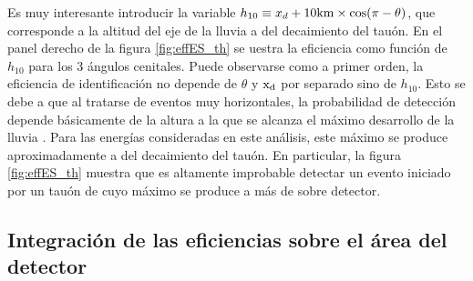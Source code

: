 	Es muy interesante introducir la variable $h_{10}\equiv x_d + 10{\rm km} \times\cos(\pi-\theta)$, que corresponde a la altitud del eje de la lluvia a  del decaimiento del tauón.
	En el panel derecho de la figura \ref{fig:effES_th} se uestra la eficiencia como función de $h_{10}$ para los 3 ángulos cenitales.
	Puede observarse como a primer orden, la eficiencia de identificación no depende de $\theta$ y ${\rm x_d}$ por separado sino de $h_{10}$.
	Esto se debe a que al tratarse de eventos muy horizontales, la probabilidad de detección depende básicamente de la altura a la que se alcanza el máximo desarrollo de la lluvia \cite{cite:tesisYann}.
	Para las energías consideradas en este análisis, este máximo se produce aproximadamente a  del decaimiento del tauón.
	En particular, la figura \ref{fig:effES_th} muestra que es altamente improbable detectar un evento iniciado por un tauón de  cuyo máximo se produce a más de  sobre detector.
	 
	
	\subsection{Integración de las eficiencias sobre el área del detector}
	
